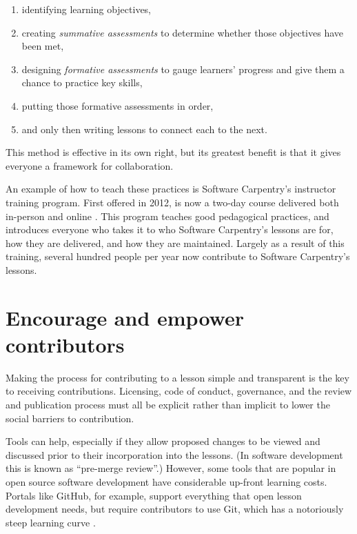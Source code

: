 \documentclass[10pt,letterpaper]{article}
\newcommand{\rulemajor}[2]{\section{#1}\label{#2}}
\begin{document}
\begin{enumerate}

  \item
    identifying learning objectives,

  \item
    creating \emph{summative assessments} to determine whether those objectives have been met,

  \item
    designing \emph{formative assessments} to gauge learners' progress
    and give them a chance to practice key skills,

  \item
    putting those formative assessments in order,

  \item
    and only then writing lessons to connect each to the next.

\end{enumerate}

\noindent
This method is effective in its own right,
but its greatest benefit is that it gives everyone a framework for collaboration.

An example of how to teach these practices is Software Carpentry's instructor training program.
First offered in 2012,
is now a two-day course delivered both in-person and online
\cite{lessons-learned,instructor-training,how-to-teach-programming}.
This program teaches good pedagogical practices,
and introduces everyone who takes it to who Software Carpentry's lessons are for,
how they are delivered,
and how they are maintained.
Largely as a result of this training,
several hundred people per year now contribute to Software Carpentry's lessons.

\rulemajor{Encourage and empower contributors}{empower}

Making the process for contributing to a lesson simple and transparent
is the key to receiving contributions.
Licensing, code of conduct, governance, and the review and publication process
must all be explicit rather than implicit
to lower the social barriers to contribution.

Tools can help,
especially if they allow proposed changes to be viewed and discussed
prior to their incorporation into the lessons.
(In software development this is known as ``pre-merge review''.)
However,
some tools that are popular in open source software development have considerable up-front learning costs.
Portals like GitHub,
for example,
support everything that open lesson development needs,
but require contributors to use Git,
which has a notoriously steep learning curve \cite{git-survey}.
\end{document}

